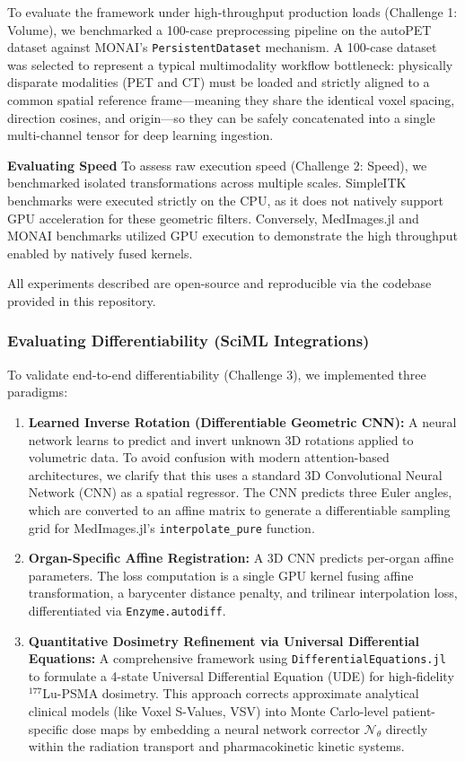\documentclass[10pt,letterpaper]{article}
\begin{document}
To evaluate the framework under high-throughput production loads (Challenge 1: Volume), we benchmarked a 100-case preprocessing pipeline on the autoPET dataset \cite{Dexl_2025} against MONAI's \texttt{PersistentDataset} mechanism. A 100-case dataset was selected to represent a typical multimodality workflow bottleneck: physically disparate modalities (PET and CT) must be loaded and strictly aligned to a common spatial reference frame---meaning they share the identical voxel spacing, direction cosines, and origin---so they can be safely concatenated into a single multi-channel tensor for deep learning ingestion. 

\textbf{Evaluating Speed}
To assess raw execution speed (Challenge 2: Speed), we benchmarked isolated transformations across multiple scales. SimpleITK benchmarks were executed strictly on the CPU, as it does not natively support GPU acceleration for these geometric filters. Conversely, MedImages.jl and MONAI benchmarks utilized GPU execution to demonstrate the high throughput enabled by natively fused kernels. 

All experiments described are open-source and reproducible via the codebase provided in this repository.

\subsubsection*{Evaluating Differentiability (SciML Integrations)}
To validate end-to-end differentiability (Challenge 3), we implemented three paradigms:
\begin{enumerate}
    \item \textbf{Learned Inverse Rotation (Differentiable Geometric CNN):} A neural network learns to predict and invert unknown 3D rotations applied to volumetric data. To avoid confusion with modern attention-based architectures, we clarify that this uses a standard 3D Convolutional Neural Network (CNN) as a spatial regressor. The CNN predicts three Euler angles, which are converted to an affine matrix to generate a differentiable sampling grid for MedImages.jl's \texttt{interpolate\_pure} function. 
    \item \textbf{Organ-Specific Affine Registration:} A 3D CNN predicts per-organ affine parameters. The loss computation is a single GPU kernel fusing affine transformation, a barycenter distance penalty, and trilinear interpolation loss, differentiated via \texttt{Enzyme.autodiff}.
    \item \textbf{Quantitative Dosimetry Refinement via Universal Differential Equations:} A comprehensive framework using \texttt{DifferentialEquations.jl} \cite{Rackauckas_2017} to formulate a 4-state Universal Differential Equation (UDE) for high-fidelity $^{177}$Lu-PSMA dosimetry. This approach corrects approximate analytical clinical models (like Voxel S-Values, VSV) into Monte Carlo-level patient-specific dose maps by embedding a neural network corrector $\mathcal{N}_\theta$ directly within the radiation transport and pharmacokinetic kinetic systems.
\end{enumerate}
\end{document}
